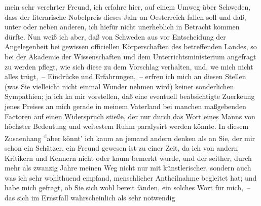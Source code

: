 \pstart{}mein sehr verehrter Freund,\pend\vspace{0.5em}
\pstart
           ich erfahre hier, auf einem Umweg
                  über Schweden, dass der literarische Nobelpreis dieses
               Jahr an Oesterreich fallen soll und daß, unter
               oder neben anderen, ich hiefür nicht unerheblich in Betracht kommen dürfte. Nun weiß
               ich aber, daß von Schweden aus vor Entscheidung
               der Angelegenheit bei gewissen officiellen Körperschaften des betreffenden Landes, so
               bei der Akademie der Wissenschaften und dem Unterrichtsministerium angefragt zu werden pflegt,
               wie sich diese zu dem {\pb}Vorschlag verhalten, und,
                  we{\geminationn} mich nicht alles trügt, – Eindrücke und
               Erfahrungen, – erfreu ich mich an diesen Stellen (was Sie vielleicht nicht einmal
               Wunder nehmen wird) keiner sonderlichen Sympathien; ja ich ka{\geminationn} mir vorstellen, daß eine eventuell beabsichtigte
                  Zuerke{\geminationn}ung jenes Preises an mich gerade in meinem
               Vaterland bei manchen maßgebenden Factoren auf einen Widerspruch stieße, der nur
               durch das Wort eines Manns von höchster Bedeutung und weitestem Ruhm paralysirt
               werden könnte. In diesem Zusa{\geminationm}enhang \substVorne{}\textsuperscript{\textcolor{gray}{d}}\substDazwischen{}a\substHinten{}ber könnt’ ich kaum an jemand andern denken als an Sie, der mir schon ein
               Schätzer, ein {\pb}Freund gewesen ist zu einer Zeit,
               da ich von andern Kritikern und Kennern nicht oder kaum bemerkt wurde, und der
               seither, durch mehr als zwanzig Jahre meinen Weg nicht nur mit künstlerischer,
               sondern \introOben{}auch\introOben{} was ich sehr wohlthuend empfand, menschlicher
               Antheilnahme begleitet hat; und habe mich gefragt, ob Sie sich wohl bereit fänden,
               ein solches Wort für mich, – das sich im Ernstfall wahrscheinlich als sehr notwendig
